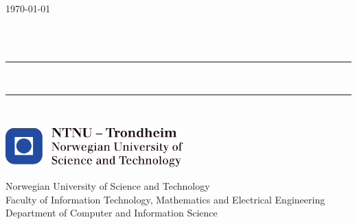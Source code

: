 \begin{titlepage}


{\large \today}

\begin{center}
    
     
    ~\\[3.5cm]
    
    \LARGE \textbf{\myauthor}\\[1.5cm]
    
    \hrule ~\\[0.2cm]
    {\fontsize{60pt}{20pt}\selectfont\mytitle}	%
    \vspace{0.5cm}
    \hrule ~\\[0.2cm]
    
    
    \vspace{1.5cm}
\end{center}




\vfill






\includegraphics[height=1.5cm]{images/ntnu_logo.pdf} 

\vspace{1.0cm} 

\large{Norwegian University of Science and Technology
\\[0.2cm]
Faculty of Information Technology, Mathematics and Electrical Engineering
\\[0.2cm]
Department of Computer and Information Science} 
\vspace{1.5cm} 

\end{titlepage}